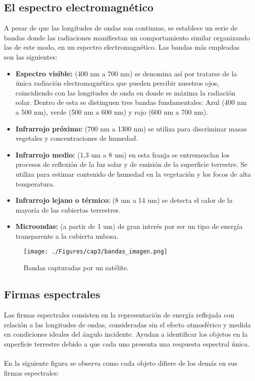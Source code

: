 \subsection{El espectro electromagn\'etico}
A pesar de que las longitudes de ondas son continuas, se establece un serie de bandas donde las radiaciones manifiestan un comportamiento similar organizando las de este modo, en un espectro electromagn\'etico\cite{remote2010abdulrahman}.
Las bandas m\'as empleadas son las siguientes\cite{salinero2002teledeteccion}:
	\begin{itemize}
		\item \textbf{Espectro visible:} (400 nm a 700 nm) se denomina as\'i por tratarse de la \'unica radiaci\'on electromagn\'etica que pueden percibir nuestros ojos, coincidiendo con las longitudes de onda en donde es m\'axima la radiaci\'on solar. Dentro de esta se distinguen tres bandas fundamentales: Azul (400 nm a 500 nm), verde (500 nm a 600 nm) y rojo (600 nm a 700 nm).
		\item \textbf{Infrarrojo pr\'oximo:} (700 nm a 1300 nm) se utiliza para discriminar masas vegetales y concentraciones de humedad.
		\item \textbf{Infrarrojo medio:} (1,3 um a 8 um) en esta franja se entremezclan los procesos de reflexi\'on de la luz solar y de emisi\'on de la superficie terrestre. Se utiliza para estimar contenido de humedad en la vegetaci\'on y los focos de alta temperatura.
		\item \textbf{Infrarrojo lejano o térmico:} (8 um a 14 um) se detecta el calor de la mayor\'ia de las cubiertas terrestres.
		\item \textbf{Microondas:} (a partir de 1 um) de gran inter\'es por ser un tipo de energ\'ia transparente a la cubierta nubosa.
	\end{itemize}
	\begin{figure}[H]
		\centering
		\texttt{[image: ./Figures/cap3/bandas\_imagen.png]}
		\caption{Bandas capturadas por un sat\'elite.}
		\label{fig:bandasIs}
	\end{figure}

\subsection{Firmas espectrales}
Las firmas espectrales consisten en la representaci\'on de energ\'ia reflejada con relaci\'on a las longitudes de ondas, consideradas sin el efecto atmosf\'erico y medida en condiciones ideales del \'angulo incidente. Ayudan a identificar los objetos en la superficie terrestre debido a que cada uno presenta una respuesta espectral \'unica\cite{sivakumar2004satellite}.\\~\\
En la siguiente figura se observa como cada objeto difiere de los dem\'as en sus firmas espectrales:

